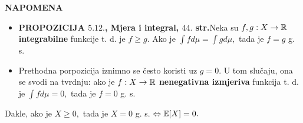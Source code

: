 \documentclass{article}
\begin{document}
\textbf{NAPOMENA}
\begin{itemize}
    \item[\ding{96}] \textbf{PROPOZICIJA \(5.12.\), Mjera i integral, \(44.\) str.}\newline Neka su \(f,g:X\to\Bbb R\) \textbf{integrabilne} funkcije t. d. je \(f\ge g.\) Ako je \(\int fd\mu=\int gd\mu,\) tada je \(f=g\) g. s.
    \item[\ding{96}] Prethodna porpozicija iznimno se često koristi uz \(g=0.\) U tom slučaju, ona se svodi na tvrdnju: ako je \(f:X\to\Bbb R\) \textbf{nenegativna izmjeriva} funkcija t. d. je \(\int fd\mu=0,\) tada je \(f=0\) g. s.
\end{itemize}
Dakle, ako je \(X\ge 0,\) tada je \(X=0\) g. s. \(\Leftrightarrow\Bbb E[X]=0.\)\newline\newline
\end{document}
